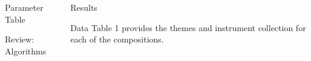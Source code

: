 \begin{frame}[t]
\begin{columns}[t]
\begin{column}{\onecolwid}
\begin{alertblock}{Parameter Table}
\end{alertblock}
\begin{alertblock}{Review: Algorithms}
\end{alertblock}
\end{column}
\begin{column}{\onecolwid} %
\begin{alertblock}{Results}
\end{alertblock}
\begin{alertblock}{Data}
Table 1 provides the themes and instrument collection for each of the compositions.


\end{alertblock}
\end{column}
\end{columns}
\end{frame}
